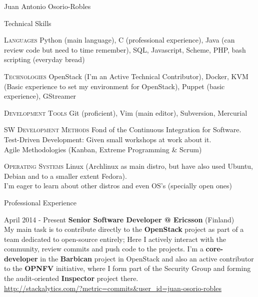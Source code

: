 \documentclass[spanish,10pt,letterpaper]{article}
\begin{document}
\begin{cv}{Juan Antonio Osorio-Robles}
	\begin{cvlist}{Technical Skills}
			\item [\textsc{Languages}]
                Python (main language), C (professional experience), Java
                (can review code but need to time remember), SQL, Javascript,
                Scheme, PHP, bash scripting (everyday bread)
			\item [\textsc{Technologies}]
                OpenStack (I'm an Active Technical Contributor), Docker,
                KVM (Basic experience to set my environment for OpenStack),
                Puppet (basic experience), GStreamer
			\item [\textsc{Development Tools}]
                Git (proficient), Vim (main editor), Subversion, Mercurial
			\item [\textsc {SW Development Methods}]
				Fond of the Continuous Integration for Software.\\
                Test-Driven Development: Given small workshops at work about
                it.\\
                Agile Methodologies (Kanban, Extreme Programming \& Scrum)
			\item [\textsc {Operating Systems}]
                Linux (Archlinux as main distro, but have also used Ubuntu,
                Debian and to a smaller extent Fedora).\\
                I'm eager to learn about other distros and even OS's (specially
                open ones)
	\end{cvlist}

	\begin{cvlist}{Professional Experience}
		\item [April 2014 - Present]
            \textbf{Senior Software Developer @ Ericsson} (Finland)\\
            My main task is to contribute directly to the
            \textbf{OpenStack} project as part of a team dedicated to
            open-source entirely; Here I actively interact with the
            community, review commits and push code to the projects. I'm a
            \textbf{core-developer} in the \textbf{Barbican} project in
            OpenStack and also an active contributor to the \textbf{OPNFV}
            initiative, where I form part of the Security Group and forming
            the audit-oriented \textbf{Inspector} project there.\\

            \href{http://stackalytics.com/?metric=commits&user_id=juan-osorio-robles}
            {\url{http://stackalytics.com/?metric=commits&user_id=juan-osorio-robles}}


\end{cvlist}
\end{cv}
\end{document}
